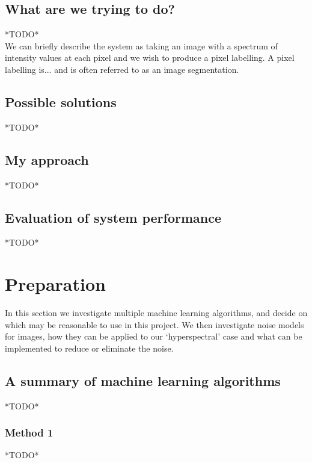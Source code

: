 \documentclass[12pt,twoside,notitlepage]{report}
\begin{document}
    \section{What are we trying to do?}
        *TODO* \\

        We can briefly describe the system as taking an image with a spectrum of intensity values at each pixel and we wish to 
        produce a pixel labelling. A pixel labelling is... and is often referred to as an image segmentation.

    \section{Possible solutions}
        *TODO*

    \section{My approach}
        *TODO*

    \section{Evaluation of system performance}
        *TODO*











\cleardoublepage
\chapter{Preparation}
    In this section we investigate multiple machine learning algorithms, and decide on which may be reasonable to use
    in this project. We then investigate noise models for images, how they can be applied to our `hyperspectral' case 
    and what can be implemented to reduce or eliminate the noise. 

    \section{A summary of machine learning algorithms}
        *TODO*
        \subsection{Method 1}
            *TODO*
            
\end{document}
